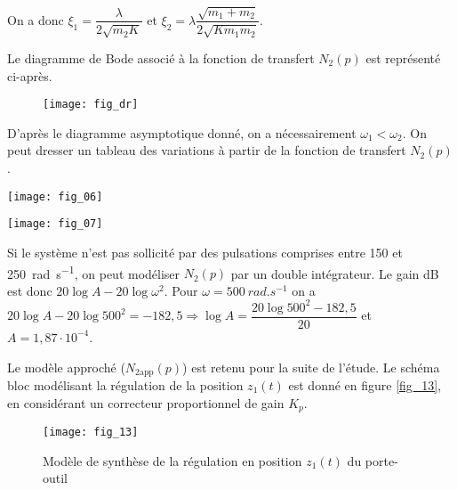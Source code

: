 \begin{multicols}{2}
\begin{corrige}
On a donc $\xi_1=\dfrac{\lambda}{2  \sqrt{m_2K}}$ et 
$\xi_2=\lambda\dfrac{\sqrt{m_1+ m_2}}{2\sqrt{Km_1m_2}}$.

\end{corrige}
\else
\fi

\ifprof
\else
Le diagramme de Bode associé à la fonction de transfert $N_2(p)$ est représenté ci-après.


\begin{figure}[H]
\centering
\texttt{[image: fig\_dr]}
\end{figure}
\fi


\ifprof
\begin{corrige}
D'après le diagramme asymptotique donné, on a nécessairement $\omega_1<\omega_2$. On peut dresser un tableau des variations à partir de la fonction de transfert $N_2(p)$. 
\begin{center}
\texttt{[image: fig\_06]}

\texttt{[image: fig\_07]}
\end{center}
\end{corrige}
\else
\fi

\ifprof
\begin{corrige}
Si le système n'est pas sollicité par des pulsations comprises entre 150 et \SI{250}{rad.s^{-1}}, on peut modéliser $N_2(p)$ par un double intégrateur. 
Le gain dB est donc  $20\log A - 20 \log \omega^2$.  Pour $\omega=\SI{500}{rad.s^{-1}}$ on a $20\log A - 20 \log 500^2=-182,5 \Rightarrow \log A = \dfrac{20 \log 500^2-182,5}{20}$ et $A=1,87\cdot 10^{-4}$.
\end{corrige}
\else
\fi

Le modèle approché ($N_{2 \text{app}}(p)$) est retenu pour la suite de l’étude. Le schéma bloc modélisant la régulation de
la position $z_1(t)$ est donné en figure \autoref{fig_13}, en considérant un correcteur proportionnel de gain $K_p$.


\begin{figure}[H]
\centering
\texttt{[image: fig\_13]}
\caption{Modèle de synthèse de la régulation en position $z_1(t)$ du porte-outil \label{fig_13}}
\end{figure}



\end{multicols}
